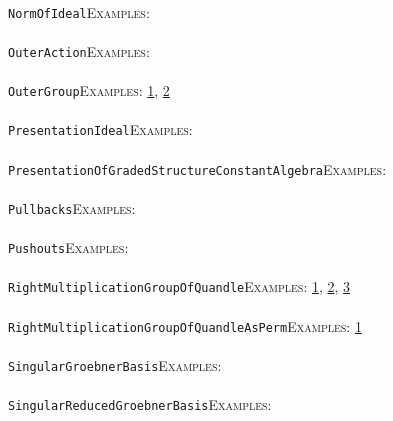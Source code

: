 \documentclass[a4paper,11pt]{report}
\begin{document}
{{ \\
 \texttt{NormOfIdeal}{\nobreakspace}{\nobreakspace}{\nobreakspace}{\nobreakspace}\textsc{Examples:} \\
 \\
 \texttt{OuterAction}{\nobreakspace}{\nobreakspace}{\nobreakspace}{\nobreakspace}\textsc{Examples:} \\
 \\
 \texttt{OuterGroup}{\nobreakspace}{\nobreakspace}{\nobreakspace}{\nobreakspace}\textsc{Examples:} \href{../www/SideLinks/About/aboutCoefficientSequence.html} {1}{\nobreakspace}, \href{../www/SideLinks/About/aboutGouter.html} {2}{\nobreakspace} \\
 \\
 \texttt{PresentationIdeal}{\nobreakspace}{\nobreakspace}{\nobreakspace}{\nobreakspace}\textsc{Examples:} \\
 \\
 \texttt{PresentationOfGradedStructureConstantAlgebra}{\nobreakspace}{\nobreakspace}{\nobreakspace}{\nobreakspace}\textsc{Examples:} \\
 \\
 \texttt{Pullbacks}{\nobreakspace}{\nobreakspace}{\nobreakspace}{\nobreakspace}\textsc{Examples:} \\
 \\
 \texttt{Pushouts}{\nobreakspace}{\nobreakspace}{\nobreakspace}{\nobreakspace}\textsc{Examples:} \\
 \\
 \texttt{RightMultiplicationGroupOfQuandle}{\nobreakspace}{\nobreakspace}{\nobreakspace}{\nobreakspace}\textsc{Examples:} \href{../www/SideLinks/About/aboutQuandles2.html} {1}{\nobreakspace}, \href{../www/SideLinks/About/aboutQuandles.html} {2}{\nobreakspace}, \href{../www/SideLinks/About/aboutKnotsQuandles.html} {3}{\nobreakspace} \\
 \\
 \texttt{RightMultiplicationGroupOfQuandleAsPerm}{\nobreakspace}{\nobreakspace}{\nobreakspace}{\nobreakspace}\textsc{Examples:} \href{../www/SideLinks/About/aboutQuandles.html} {1}{\nobreakspace} \\
 \\
 \texttt{SingularGroebnerBasis}{\nobreakspace}{\nobreakspace}{\nobreakspace}{\nobreakspace}\textsc{Examples:} \\
 \\
 \texttt{SingularReducedGroebnerBasis}{\nobreakspace}{\nobreakspace}{\nobreakspace}{\nobreakspace}\textsc{Examples:} \\
 \\
}}
\end{document}
